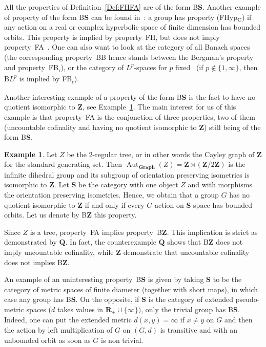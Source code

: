 \documentclass[a4paper]{article}
\theoremstyle{definition}
\newtheorem{exmp}[lem]{Example}
\DeclareMathOperator\Aut{Aut}
\newcommand*{\field}[1]{\mathbf{#1}}
\newcommand*{\category}[1]{\textbf{#1}}
\newcommand*{\CatS}{\category{S}}
\newcommand*{\Z}{\field{Z}}
\newcommand*{\R}{\field{R}}
\newcommand*{\BS}{B\textbf{S}}
\newcommand*{\BZ}{B\textbf{Z}}
\newcommand*{\FB}{FB\textsubscript{r}}
\newcommand*{\FH}{FH}
\newcommand*{\FA}{FA}
\begin{document}
All the properties of Definition~\ref{Def:FHFA} are of the form \BS.
Another example of property of the form \BS{} can be found in~\cite[Definition 6.22]{MR1023471}: a group has property (FHyp$_{\field{C}}$) if any action on a real or complex hyperbolic space of finite dimension has bounded orbits.
This property is implied by property~\FH, but does not imply property~\FA{}~\cite[Corollary 6.23 and Example 6.24]{MR1023471}.
One can also want to look at the category of all Banach spaces (the corresponding property~BB hence stands between the Bergman's property and property~\FB), or the category of $L^p$-spaces for $p$ fixed~\cite{MR2978328} (if $p\notin\{1,\infty\}$, then B$L^p$ is implied by \FB).

Another interesting example of a property of the form \BS{} is the fact to have no quotient isomorphic to $\Z$, see Example~\ref{Exmp:BZ}.
The main interest for us of this example is that property~\FA{} is the conjonction of three properties, two of them (uncountable cofinality and having no quotient isomorphic to $\Z$) still being of the form \BS.
%
%
\begin{exmp}\label{Exmp:BZ}
Let $Z$ be the $2$-regular tree, or in other words the Cayley graph of $\Z$ for the standard generating set.
Then $\Aut_{\mathbf{Graph}}(Z)=\Z\rtimes (\Z/2\Z)$ is the infinite dihedral group and its subgroup of orientation preserving isometries is isomorphic to $\Z$.
Let \textbf{S} be the category with one object $Z$ and with morphisms the orientation preserving isometries.
Hence, we obtain that a group $G$ has no quotient isomorphic to $\Z$ if and only if every $G$ action on \textbf{S}-space has bounded orbits.
Let us denote by \BZ{} this property.

Since $Z$ is a tree, property~\FA{} implies property~\BZ. This implication is strict as demonstrated by $\field{Q}$.
In fact, the counterexample $\field{Q}$ shows that \BZ{} does not imply uncountable cofinality, while $\Z$ demonstrate that uncountable cofinality does not implies \BZ.
\end{exmp}
%
%
An example of an uninteresting property~\BS{} is given by taking \CatS{} to be the category of metric spaces of finite diameter (together with short maps), in which case any group has \BS.
On the opposite, if \CatS{} is the category of extended pseudo-metric spaces ($d$ takes values in $\R_+\cup\{\infty\})$, only the trivial group has \BS.
Indeed, one can put the extended metric $d(x,y)=\infty$ if $x\neq y$ on $G$ and then the action by left multiplication of $G$ on $(G,d)$ is transitive and with an unbounded orbit as soon as $G$ is non trivial.
\end{document}
